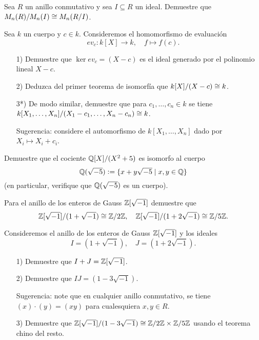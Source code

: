 \begin{ejercicio}
  Sea $R$ un anillo conmutativo y sea $I \subseteq R$ un ideal. Demuestre que
  $M_n (R) / M_n (I) \cong M_n (R/I)$.
\end{ejercicio}

\begin{ejercicio}
  Sea $k$ un cuerpo y $c\in k$. Consideremos el homomorfismo de evaluación
  $$ev_c\colon k [X] \to k, \quad f \mapsto f (c).$$

  \begin{enumerate}
  \item[1)] Demuestre que $\ker ev_c = (X - c)$ es el ideal generado por
    el polinomio lineal $X - c$.

  \item[2)] Deduzca del primer teorema de isomorfía que $k [X] / (X-c) \cong k$.

  \item[3*)] De modo similar, demuestre que para $c_1,\ldots,c_n \in k$ se tiene
    $k [X_1,\ldots,X_n] / (X_1 - c_1, \ldots, X_n - c_n) \cong k$.

    Sugerencia: considere el automorfismo de $k [X_1,\ldots,X_n]$ dado por
    $X_i \mapsto X_i + c_i$.
  \end{enumerate}
\end{ejercicio}

\begin{ejercicio}
  Demuestre que el cociente $\mathbb{Q} [X] / (X^2 + 5)$ es isomorfo al cuerpo
  $$\mathbb{Q} (\sqrt{-5}) \mathrel{\mathop:}= \{ x + y\sqrt{-5} \mid x,y \in \mathbb{Q} \}$$
  (en particular, verifique que $\mathbb{Q} (\sqrt{-5})$ es un cuerpo).
\end{ejercicio}

\begin{ejercicio}
  Para el anillo de los enteros de Gauss $\mathbb{Z} [\sqrt{-1}]$ demuestre que
  \[ \mathbb{Z} [\sqrt{-1}]/(1 + \sqrt{-1}) \cong \mathbb{Z}/2\mathbb{Z},
     \quad
     \mathbb{Z} [\sqrt{-1}]/(1 + 2\sqrt{-1}) \cong \mathbb{Z}/5\mathbb{Z}. \]
\end{ejercicio}

\begin{ejercicio}
  Consideremos el anillo de los enteros de Gauss $\mathbb{Z} [\sqrt{-1}]$ y los ideales
  $$I = (1 + \sqrt{-1}), \quad J = (1 + 2\sqrt{-1}).$$

  \begin{enumerate}
  \item[1)] Demuestre que $I + J = \mathbb{Z} [\sqrt{-1}]$.

  \item[2)] Demuestre que $IJ = (1 - 3\sqrt{-1})$.

    Sugerencia: note que en cualquier anillo conmutativo, se tiene
    $(x)\cdot (y) = (xy)$ para cualesquiera $x,y\in R$.

  \item[3)] Demuestre que
    $\mathbb{Z} [\sqrt{-1}]/(1 - 3\sqrt{-1}) \cong \mathbb{Z}/2\mathbb{Z} \times \mathbb{Z}/5\mathbb{Z}$ usando
    el teorema chino del resto.
  \end{enumerate}
\end{ejercicio}

